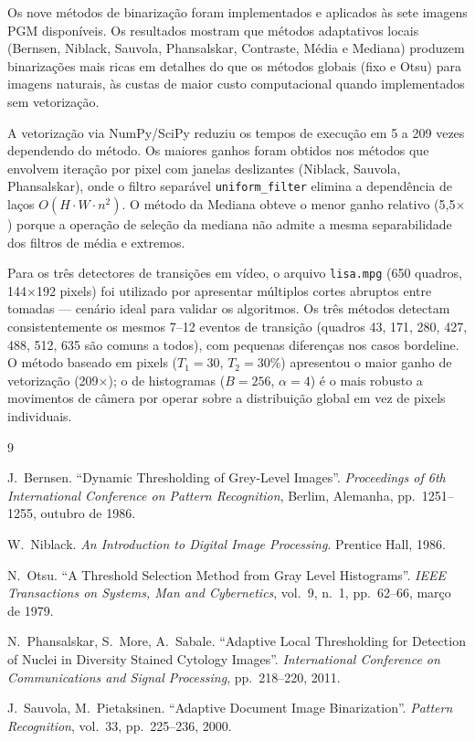 \documentclass[12pt,a4paper]{article}
\begin{document}
Os nove métodos de binarização foram implementados e aplicados às sete imagens PGM
disponíveis. Os resultados mostram que métodos adaptativos locais (Bernsen, Niblack, Sauvola,
Phansalskar, Contraste, Média e Mediana) produzem binarizações mais ricas em detalhes do
que os métodos globais (fixo e Otsu) para imagens naturais, às custas de maior custo
computacional quando implementados sem vetorização.

A vetorização via NumPy/SciPy reduziu os tempos de execução em 5 a 209 vezes dependendo
do método. Os maiores ganhos foram obtidos nos métodos que envolvem iteração por pixel com
janelas deslizantes (Niblack, Sauvola, Phansalskar), onde o filtro separável
\texttt{uniform\_filter} elimina a dependência de laços $O(H \cdot W \cdot n^2)$. O
método da Mediana obteve o menor ganho relativo (5,5$\times$) porque a operação de
seleção da mediana não admite a mesma separabilidade dos filtros de média e extremos.

Para os três detectores de transições em vídeo, o arquivo \texttt{lisa.mpg} (650 quadros,
144$\times$192 pixels) foi utilizado por apresentar múltiplos cortes abruptos entre tomadas —
cenário ideal para validar os algoritmos. Os três métodos detectam consistentemente os mesmos
7--12 eventos de transição (quadros 43, 171, 280, 427, 488, 512, 635 são comuns a todos),
com pequenas diferenças nos casos bordeline. O método baseado em pixels ($T_1=30$,
$T_2=30\%$) apresentou o maior ganho de vetorização (209$\times$); o de histogramas
($B=256$, $\alpha=4$) é o mais robusto a movimentos de câmera por operar sobre a
distribuição global em vez de pixels individuais.

\begin{thebibliography}{9}

J.~Bernsen.
``Dynamic Thresholding of Grey-Level Images''.
\textit{Proceedings of 6th International Conference on Pattern Recognition},
Berlim, Alemanha, pp.~1251--1255, outubro de 1986.

W.~Niblack.
\textit{An Introduction to Digital Image Processing}.
Prentice Hall, 1986.

N.~Otsu.
``A Threshold Selection Method from Gray Level Histograms''.
\textit{IEEE Transactions on Systems, Man and Cybernetics},
vol.~9, n.~1, pp.~62--66, março de 1979.

N.~Phansalskar, S.~More, A.~Sabale.
``Adaptive Local Thresholding for Detection of Nuclei in Diversity Stained Cytology Images''.
\textit{International Conference on Communications and Signal Processing},
pp.~218--220, 2011.

J.~Sauvola, M.~Pietaksinen.
``Adaptive Document Image Binarization''.
\textit{Pattern Recognition},
vol.~33, pp.~225--236, 2000.

\end{thebibliography}
\end{document}
